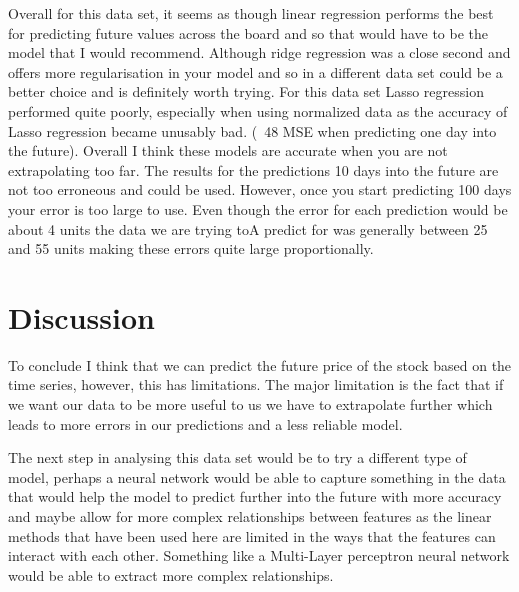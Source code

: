 \documentclass{report}
\begin{document}
Overall for this data set, it seems as though linear regression performs the best for predicting future values across the board and so that would have to be the model that I would recommend. Although ridge regression was a close second and offers more regularisation in your model and so in a different data set could be a better choice and is definitely worth trying.
For this data set Lasso regression performed quite poorly, especially when using normalized data as the accuracy of Lasso regression became unusably bad. (~48 MSE when predicting one day into the future).
Overall I think these models are accurate when you are not extrapolating too far. The results for the predictions 10 days into the future are not too erroneous and could be used. However, once you start predicting 100 days your error is too large to use. Even though the error for each prediction would be about 4 units the data we are trying toA predict for was generally between 25 and 55 units making these errors quite large proportionally.

\section{Discussion}

To conclude I think that we can predict the future price of the stock based on the time series, however, this has limitations. The major limitation is the fact that if we want our data to be more useful to us we have to extrapolate further which leads to more errors in our predictions and a less reliable model.

The next step in analysing this data set would be to try a different type of model, perhaps a neural network would be able to capture something in the data that would help the model to predict further into the future with more accuracy and maybe allow for more complex relationships between features as the linear methods that have been used here are limited in the ways that the features can interact with each other. Something like a Multi-Layer perceptron neural network would be able to extract more complex relationships.
\end{document}
